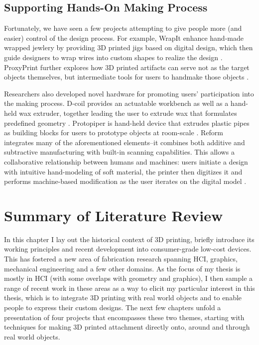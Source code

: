 \subsection{Supporting Hands-On Making Process}
Fortunately, we have seen a few projects attempting to give people more (and easier) control of the design process. For example, WrapIt enhance hand-made wrapped jewlery by providing 3D printed jigs based on digital design, which then guide designers to wrap wires into custom shapes to realize the design \cite{iarussi2015wrapit}. ProxyPrint further explores how 3D printed artifacts can serve not as the target objects themselves, but intermediate tools for users to handmake those objects \cite{torres2016proxyprint}. 

Researchers also developed novel hardware for promoting users' participation into the making process. D-coil provides an actuatable workbench as well as a hand-held wax extruder, together leading the user to extrude wax that formulates predefined geometry \cite{peng2015d}. Protopiper is hand-held device that extrudes plastic pipes as building blocks for users to prototype objects at room-scale \cite{agrawal2015protopiper}. Reform integrates many of the aforementioned elements--it combines both additive and subtractive manufacturing with built-in scanning capabilities. This allows a collaborative relationship between humans and machines: users initiate a design with intuitive hand-modeling of soft material, the printer then digitizes it and performs machine-based modification as the user iterates on the digital model \cite{weichel2015reform}.


\section{Summary of Literature Review}
In this chapter I lay out the historical context of 3D printing, briefly introduce its working principles and recent development into consumer-grade low-cost devices. This has fostered a new area of fabrication research spanning HCI, graphics, mechanical engineering and a few other domains. As the focus of my thesis is mostly in HCI (with some overlaps with geometry and graphics), I then sample a range of recent work in these areas as a way to elicit my particular interest in this thesis, which is to integrate 3D printing with real world objects and to enable people to express their custom designs. The next few chapters unfold a presentation of four projects that encompasses these two themes, starting with techniques for making 3D printed attachment directly onto, around and through real world objects.